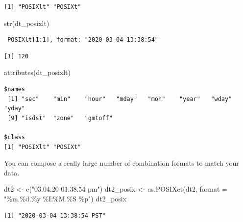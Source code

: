 \documentclass[
]{book}
\newenvironment{Shaded}{\begin{snugshade}}{\end{snugshade}}
\newcommand{\AttributeTok}[1]{\textcolor[rgb]{0.77,0.63,0.00}{#1}}
\newcommand{\FunctionTok}[1]{\textcolor[rgb]{0.00,0.00,0.00}{#1}}
\newcommand{\NormalTok}[1]{#1}
\newcommand{\OtherTok}[1]{\textcolor[rgb]{0.56,0.35,0.01}{#1}}
\newcommand{\SpecialCharTok}[1]{\textcolor[rgb]{0.00,0.00,0.00}{#1}}
\newcommand{\StringTok}[1]{\textcolor[rgb]{0.31,0.60,0.02}{#1}}
\begin{document}
\begin{verbatim}
[1] "POSIXlt" "POSIXt" 
\end{verbatim}

\begin{Shaded}
\begin{Highlighting}[]
\FunctionTok{str}\NormalTok{(dt\_posixlt)}
\end{Highlighting}
\end{Shaded}

\begin{verbatim}
 POSIXlt[1:1], format: "2020-03-04 13:38:54"
\end{verbatim}

\begin{Shaded}
\end{Shaded}

\begin{verbatim}
[1] 120
\end{verbatim}

\begin{Shaded}
\begin{Highlighting}[]
\FunctionTok{attributes}\NormalTok{(dt\_posixlt)}
\end{Highlighting}
\end{Shaded}

\begin{verbatim}
$names
 [1] "sec"    "min"    "hour"   "mday"   "mon"    "year"   "wday"   "yday"  
 [9] "isdst"  "zone"   "gmtoff"

$class
[1] "POSIXlt" "POSIXt" 
\end{verbatim}

You can compose a really large number of combination formats to match your data.

\begin{Shaded}
\begin{Highlighting}[]
\NormalTok{dt2 }\OtherTok{\textless{}{-}} \FunctionTok{c}\NormalTok{(}\StringTok{"03.04.20 01:38.54 pm"}\NormalTok{)}
\NormalTok{dt2\_posix }\OtherTok{\textless{}{-}} \FunctionTok{as.POSIXct}\NormalTok{(dt2, }\AttributeTok{format =} \StringTok{"\%m.\%d.\%y \%I:\%M.\%S \%p"}\NormalTok{)}
\NormalTok{dt2\_posix}
\end{Highlighting}
\end{Shaded}

\begin{verbatim}
[1] "2020-03-04 13:38:54 PST"
\end{verbatim}
\end{document}
